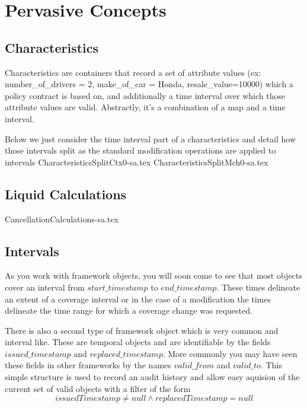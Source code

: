\motto{}
\chapter{Pervasive Concepts}
\label{intro03} %

\abstract{
}

\section{Characteristics}
\label{sec:03:1}

Characteristics are containers that record a set of attribute values
(ex: number\_of\_drivers = 2, make\_of\_car = Honda, resale\_value=10000)
which a policy contract is based on, and additionally a time interval over which
those attribute values are valid. Abstractly, it's a combination of a map and a time
interval. 

Below we just consider the time interval part of a characteristics and detail
how those intervals split as the standard modification operations are applied
to intervals
{CharacteristicsSplitCtx0-sa.tex}
{CharacteristicsSplitMch0-sa.tex}

\section{Liquid Calculations}
\label{sec:03:2}

{CancellationCalculations-sa.tex}

\section{Intervals}
As you work with framework objects, you will soon come to see that most objects cover
an interval from $start\_timestamp$ to $end\_timestamp$. These times delineate an extent of
a coverage interval or in the case of a modification the times delineate the time range for
which a coverage change was requested.

There is also a second type of framework object which is very common and interval like. These
are temporal objects and are identifiable by the fields $issued\_timestamp$ and $replaced\_timestamp$.
More commonly you may have seen these fields in other frameworks by the names $valid\_from$ and
$valid\_to$. This simple structure is used to record an audit history and allow easy aquision of the current set
of valid objects with a filter of the form
\begin{equation*}
issuedTimestamp \neq null \land replacedTimestamp = null
\end{equation*}

